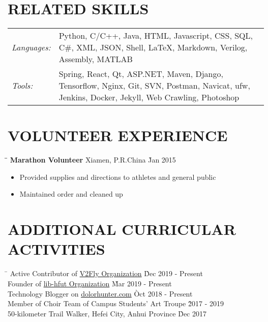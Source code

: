 \documentclass{res}
\begin{document}
\begin{resume}
\section{RELATED SKILLS}  
    \vspace{+0.05in}	 
    \begin{tabular}{l p{4.6in}}
    {\sl Languages:} & Python, C/C++, Java, HTML, Javascript, CSS, 
                       SQL, C\#, XML, JSON, Shell, LaTeX, Markdown, Verilog, 
                       Assembly, MATLAB \\ 
    {\sl Tools:}  &  Spring, React, Qt, ASP.NET, Maven, Django, Tensorflow, Nginx, 
                        Git, SVN, Postman, Navicat, ufw, Jenkins, Docker, Jekyll, 
                        Web Crawling, Photoshop
    \end{tabular}   

\vspace{-0.12in}	
\section{VOLUNTEER EXPERIENCE}
    \vspace{-0.1in}
    \begin{tabbing}
    \hspace{2.3in}\= \hspace{2.6in}\= \kill %
    {\bf Marathon Volunteer} \> Xiamen, P.R.China     \` Jan 2015\\
    \end{tabbing}\vspace{-20pt}      %
    \begin{itemize} \itemsep -2pt %
    \item Provided supplies and directions to athletes and general public
    \item Maintained order and cleaned up
    \end{itemize}

\vspace{-0.12in}	    
\section{ADDITIONAL CURRICULAR ACTIVITIES}
    \vspace{-0.1in}	
    \begin{tabbing}
    \hspace{5in}\= \kill %
    Active Contributor of \href{https://github.com/v2fly}{V2Fly Organization} \` Dec 2019 - Present \\ 
    Founder of \href{https://github.com/lib-hfut}{lib-hfut Organization} \` Mar 2019 - Present \\  
    Technology Blogger on \href{https://dolorhunter.com}{dolorhunter.com} \` Oct 2018 - Present \\
    Member of Choir Team of Campus Students' Art Troupe \` 2017 - 2019 \\
    50-kilometer Trail Walker, Hefei City, Anhui Province \` Dec 2017  
    \end{tabbing}\vspace{-20pt}      %

\end{resume}
\end{document}
